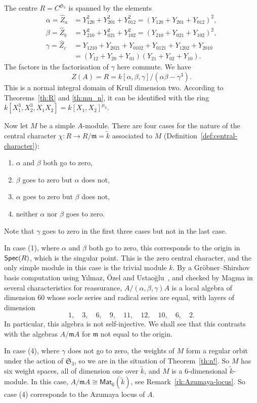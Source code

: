 \documentclass[12pt]{amsart}
\newcommand{\Mat}{\mathsf{Mat}}
\newcommand{\Spec}{\operatorname{\sf Spec}}
\newcommand{\sym}[1]{\mathfrak{S}_{#1}}
\newcommand{\mfm}{\mathfrak{m}}
\numberwithin{equation}{section}
\theoremstyle{definition}
\begin{document}
The centre $R=C^{\sym{3}}$ is spanned by the elements
\begin{align*} 
\alpha=\hat Z_a&=Y_{120}^2+Y_{201}^2+Y_{012}^2
=(Y_{120}+Y_{201}+Y_{012})^2, \\
\beta=\hat Z_b&=Y_{210}^2+Y_{021}^2+Y_{102}^2
=(Y_{210}+Y_{021}+Y_{102})^2, \\
\gamma=\hat Z_c&=Y_{1210}+Y_{2021}+
Y_{0102}+Y_{0121}+Y_{1202}+Y_{2010}\\
&=(Y_{12}+Y_{20}+Y_{01})(Y_{21}+Y_{02}+Y_{10}). 
\end{align*}
The factors in the factorisation of $\gamma$ here commute.
We have 
\[ Z(A)=R=k[\alpha,\beta,\gamma]/(\alpha\beta-\gamma^3). \]
This is a normal integral domain of Krull dimension two. According to 
Theorems~\ref{th:R} and \ref{th:mu_n}, it can be identified with the ring
$k[X_1^3,X_2^3,X_1X_2]=k[X_1,X_2]^{\mu_3}$. 

Now let $M$ be a simple $A$-module. There are four cases for the
nature of the central character $\chi:R\to R/\mfm=\tilde k$ associated to $M$
(Definition~\ref{def:central-character}): 
\begin{enumerate}
\item $\alpha$ and $\beta$ both go to zero, 
\item $\beta$ goes to zero but $\alpha$ does not,
\item $\alpha$ goes to zero but $\beta$ does not,
\item neither $\alpha$ nor $\beta$ goes to zero.
\end{enumerate}
Note that $\gamma$ goes to zero in the first three cases but not in
the last case.



In case (1), where $\alpha$ and $\beta$ both go to zero, this corresponds to the
origin in $\Spec(R)$, which is the singular point. 
This is the zero central character, and the only simple module 
in this case is the trivial module $k$. By a Gr\"obner--Shirshov basis computation using Y{\i}lmaz, \"Ozel and
Ustao\u{g}lu~\cite[Theorem~21]{Yilmaz/Ozel/Ustaoglu:2014a}, and checked
by {\sc Magma} in several characteristics for reassurance,
$A/(\alpha,\beta,\gamma)A$ is a local
algebra of dimension $60$ whose
socle series and radical series are equal, with
layers of dimension 
\[ 1,\quad 3,\quad 6,\quad 9,\quad 11,\quad 12,
\quad 10,\quad 6,\quad 2. \]
In particular, this algebra is not self-injective. We shall see that
this contrasts with 
the algebras $A/\mfm A$ for $\mfm$ not equal to the origin.


In case (4), where $\gamma$ does not go to zero, the weights of $M$ form a regular orbit under the action of $\sym{3}$, so we are in the
situation of Theorem~\ref{th:n!}. So $M$ has six weight spaces, all of
dimension one over $\tilde k$, and $M$ is a $6$-dimensional $\tilde
k$-module. In this case, $A/\mfm A\cong \Mat_6(\tilde k)$, see
Remark~\ref{rk:Azumaya-locus}. So case (4) corresponds to the Azumaya
locus of $A$.
\end{document}
